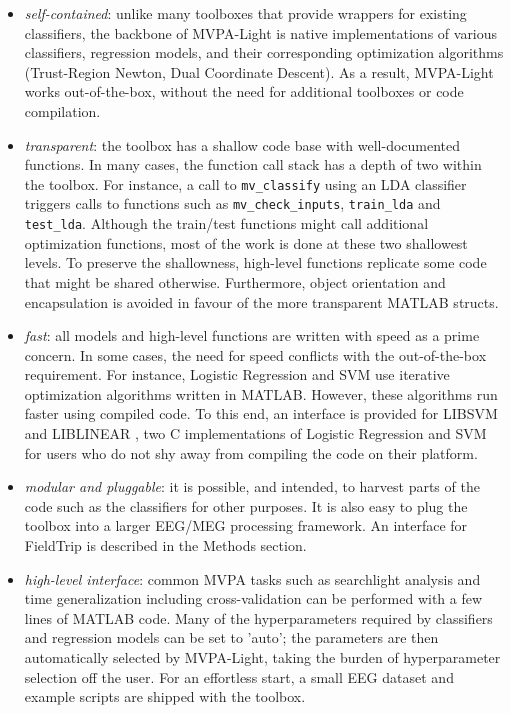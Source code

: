 \documentclass[utf8]{frontiersSCNS} %
\begin{document}
\begin{itemize}
\item \textit{self-contained}: unlike many toolboxes that provide wrappers for existing classifiers, the backbone of MVPA-Light is  native implementations of various classifiers, regression models, and their corresponding optimization algorithms (Trust-Region Newton, Dual Coordinate Descent). As a result, MVPA-Light works out-of-the-box, without the need for additional toolboxes or  code compilation.
\item \textit{transparent}: the toolbox has a shallow code base with well-documented functions. In many cases, the function call stack has a depth of two within the toolbox. For instance, a call to \texttt{mv\_classify} using an LDA classifier triggers calls to functions such as  \texttt{mv\_check\_inputs}, \texttt{train\_lda} and \texttt{test\_lda}. Although the train/test functions might call additional optimization functions, most of the work is done at these two shallowest levels. To preserve the shallowness, high-level functions replicate some code that might be shared otherwise. Furthermore, object orientation and encapsulation is avoided in favour of the more transparent MATLAB structs.
\item \textit{fast}: all models and high-level functions are written with speed as a prime concern. In some cases, the need for speed conflicts with the out-of-the-box requirement. For instance, Logistic Regression and SVM use iterative optimization algorithms written in MATLAB. However, these algorithms run faster using compiled code. To this end, an interface is provided for LIBSVM \citep{Chang2011LIBSVM:Machines} and LIBLINEAR \citep{Fan2008}, two C implementations of Logistic Regression and SVM for users who do not shy away from compiling the code on their platform.
\item \textit{modular and pluggable}: it is possible, and intended, to harvest parts of the code such as the classifiers for other purposes. It is also easy to plug the toolbox into a larger EEG/MEG processing framework. An interface for FieldTrip \citep{Oostenveld2011} is described in the Methods section.
\item \textit{high-level interface}: common MVPA tasks such as searchlight analysis and time generalization including cross-validation can be performed with a few lines of MATLAB code. Many of the hyperparameters required by classifiers and regression models can be set to 'auto'; the parameters are then automatically selected by MVPA-Light, taking the burden of hyperparameter selection off the user. For an effortless start, a small EEG dataset and example scripts are shipped with the toolbox.
\end{itemize}
\end{document}
